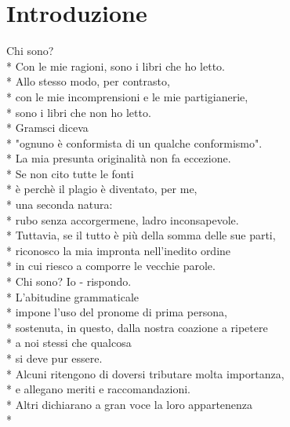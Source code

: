 \documentclass[12pt]{book}
\begin{document}
\maketitle
\makededication


\frontmatter


\renewcommand*{\topname}{Indice} %
\maketop


\section{Introduzione}
Chi sono? \\*
Con le mie ragioni, sono i libri che ho letto. \\*
Allo stesso modo, per contrasto, \\*
con le mie incomprensioni e le mie partigianerie, \\*
sono i libri che non ho letto. \\*
Gramsci diceva \\*
"ognuno è conformista di un qualche conformismo". \\*
La mia presunta originalità non fa eccezione. \\*
Se non cito tutte le fonti \\*
è perchè il plagio è diventato, per me, \\*
una seconda natura: \\*
rubo senza accorgermene, ladro inconsapevole. \\*
Tuttavia, se il tutto è più della somma delle sue parti, \\*
riconosco la mia impronta nell'inedito ordine \\*
in cui riesco a comporre le vecchie parole. \\*
Chi sono? Io - rispondo. \\*
L'abitudine grammaticale \\*
impone l'uso del pronome di prima persona, \\*
sostenuta, in questo, dalla nostra coazione a ripetere \\*
a noi stessi che qualcosa \\*
si deve pur essere. \\*
Alcuni ritengono di doversi tributare molta importanza,\\*
e allegano meriti e raccomandazioni. \\*
Altri dichiarano a gran voce la loro appartenenza \\*
\end{document}
